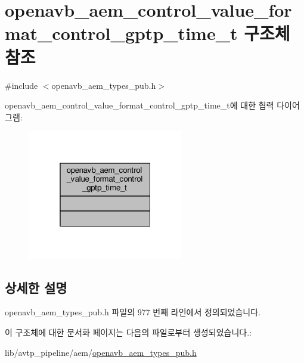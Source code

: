 \hypertarget{structopenavb__aem__control__value__format__control__gptp__time__t}{}\section{openavb\+\_\+aem\+\_\+control\+\_\+value\+\_\+format\+\_\+control\+\_\+gptp\+\_\+time\+\_\+t 구조체 참조}
\label{structopenavb__aem__control__value__format__control__gptp__time__t}


{\ttfamily \#include $<$openavb\+\_\+aem\+\_\+types\+\_\+pub.\+h$>$}



openavb\+\_\+aem\+\_\+control\+\_\+value\+\_\+format\+\_\+control\+\_\+gptp\+\_\+time\+\_\+t에 대한 협력 다이어그램\+:
\nopagebreak
\begin{figure}[H]
\begin{center}
\leavevmode
\includegraphics[width=193pt]{structopenavb__aem__control__value__format__control__gptp__time__t__coll__graph}
\end{center}
\end{figure}


\subsection{상세한 설명}


openavb\+\_\+aem\+\_\+types\+\_\+pub.\+h 파일의 977 번째 라인에서 정의되었습니다.



이 구조체에 대한 문서화 페이지는 다음의 파일로부터 생성되었습니다.\+:\begin{DoxyCompactItemize}
\item 
lib/avtp\+\_\+pipeline/aem/\hyperlink{openavb__aem__types__pub_8h}{openavb\+\_\+aem\+\_\+types\+\_\+pub.\+h}\end{DoxyCompactItemize}
